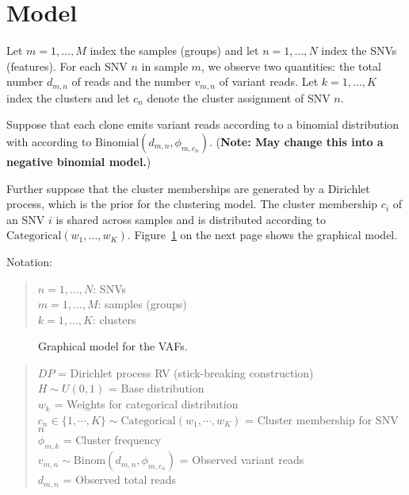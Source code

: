 \documentclass[11pt]{article}
\newcommand{\adjustimg}{%
  \checkoddpage%
  \ifoddpage\hspace*{\dimexpr\evensidemargin-\oddsidemargin}\else\hspace*{-\dimexpr\evensidemargin-\oddsidemargin}\fi%
}
\newcommand{\centerimg}[2][width=\textwidth]{%
  \makebox[\textwidth]{\adjustimg\texttt{[image: \#2]}}%
}
\begin{document}
\newpage

\section{Model}

Let $m = 1, \ldots, M$ index the samples (groups) and let $n = 1, ..., N$ index the SNVs (features). For each SNV $n$ in sample $m$, we observe two quantities: the total number $d_{m, n}$ of reads and the number $v_{m, n}$ of variant reads. Let $k=1,\ldots,K$ index the clusters and let $c_n$ denote the cluster assignment of SNV $n$.

Suppose that each clone emits variant reads according to a binomial distribution with according to $\mathrm{Binomial}(d_{m,n}, \phi_{m,c_n})$. (\textbf{Note: May change this into a negative binomial model.}) 

Further suppose that the cluster memberships are generated by a Dirichlet process, which is the prior for the clustering model. The cluster membership $c_i$ of an SNV $i$ is shared across samples and is distributed according to $\mathrm{Categorical}(w_1,\ldots,w_K)$.
Figure~\ref{fig:GM} on the next page shows the graphical model.

\newpage
Notation:

\begin{quote}
$n = 1, \ldots , N$:  SNVs \\
$m = 1, \ldots , M$: samples (groups) \\
$k = 1, \ldots ,  K$: clusters
\end{quote}

\begin{figure}[H]
\centerimg[scale=1.0]{multi_pgm.png}
\caption{Graphical model for the VAFs.}
\label{fig:GM}
\end{figure}

\begin{quote}
$DP$ = Dirichlet process RV (stick-breaking construction) \\
$H \sim U(0,1)$ = Base distribution	 \\
$w_k$ = Weights for categorical distribution \\
$c_{n} \in \{1, \cdots, K\}  \sim \mathrm{Categorical}(w_1, \cdots, w_K)$ =  Cluster membership for SNV $n$\\
$\phi_{m,k}$ = Cluster frequency \\ 
$v_{m,n} \sim \mathrm{Binom}(d_{m,n}, \phi_{m,c_n})$ = Observed variant reads\\ 
$d_{m,n}$ = Observed total reads
\end{quote}
\end{document}
